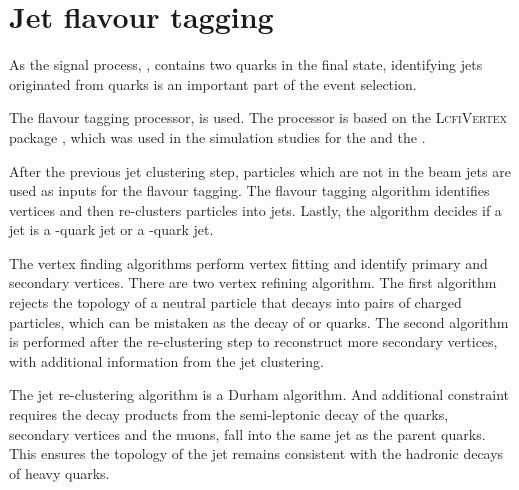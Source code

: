 \section{Jet flavour tagging}
\label{sec:doubleHiggsFlavourTagging}

As the signal process, \eeToHHbbWWHad,  contains two \Pbottom quarks in the final state, identifying jets originated from \Pbottom quarks is an important part of the event selection.



The flavour tagging processor, \lcfiplus \cite{Suehara:2015ura} is used. The processor is based on the \textsc{LcfiVertex} package \cite{Bailey:2009ui}, which was used in the simulation studies for the \ILCloi \cite{Abe:2010aa,Aihara:2009ad} and the \CLICcdr \cite{Linssen:2012hp}.

After the previous jet clustering step, particles which are not in the beam jets are used as inputs for the flavour tagging. The flavour tagging algorithm identifies vertices and then re-clusters particles into jets. Lastly, the algorithm decides if a jet is a \Pbottom-quark jet or a \Pcharm-quark jet.


The vertex finding algorithms perform vertex fitting and identify primary and secondary vertices. There are two vertex refining algorithm. The first algorithm rejects the topology of a  neutral particle that decays into pairs of charged particles, which can be mistaken as  the decay of \Pbottom or \Pcharm quarks. The second algorithm is performed after the re-clustering step to reconstruct more secondary vertices, with additional information from the jet clustering.

The jet re-clustering algorithm is a Durham algorithm. And additional constraint requires the decay products from the semi-leptonic decay of the quarks, secondary vertices and the muons, fall into the same  jet as the parent quarks. This ensures the topology of the jet remains consistent with the hadronic decays of heavy quarks.


